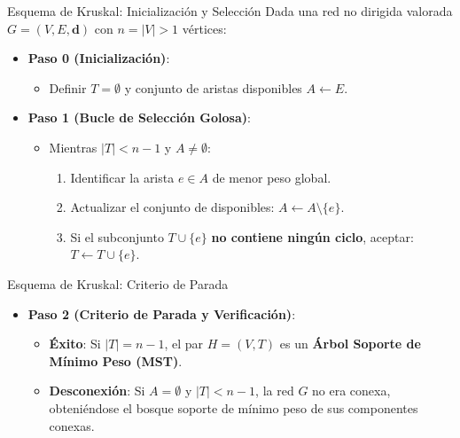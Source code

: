 \documentclass[
  ignorenonframetext,
]{beamer}
\providecommand{\tightlist}{%
  \setlength{\itemsep}{0pt}\setlength{\parskip}{0pt}}
\begin{document}
\begin{frame}{Esquema de Kruskal: Inicialización y Selección}
\label{esquema-de-kruskal-inicializaciuxf3n-y-selecciuxf3n}
Dada una red no dirigida valorada \(G = (V, E, \mathbf{d})\) con
\(n = |V| > 1\) vértices:

\begin{itemize}
\tightlist
\item
  \textbf{Paso 0 (Inicialización)}:

  \begin{itemize}
  \tightlist
  \item
    Definir \(T = \emptyset\) y conjunto de aristas disponibles
    \(A \leftarrow E\).
  \end{itemize}
\item
  \textbf{Paso 1 (Bucle de Selección Golosa)}:

  \begin{itemize}
  \tightlist
  \item
    Mientras \(|T| < n - 1\) y \(A \neq \emptyset\):

    \begin{enumerate}
    \tightlist
    \item
      Identificar la arista \(e \in A\) de menor peso global.
    \item
      Actualizar el conjunto de disponibles:
      \(A \leftarrow A \setminus \{e\}\).
    \item
      Si el subconjunto \(T \cup \{e\}\) \textbf{no contiene ningún
      ciclo}, aceptar: \(T \leftarrow T \cup \{e\}\).
    \end{enumerate}
  \end{itemize}
\end{itemize}
\end{frame}

\begin{frame}{Esquema de Kruskal: Criterio de Parada}
\label{esquema-de-kruskal-criterio-de-parada}
\begin{itemize}
\item
  \textbf{Paso 2 (Criterio de Parada y Verificación)}:

  \begin{itemize}
  \item
    \textbf{Éxito}: Si \(|T| = n - 1\), el par \(H = (V, T)\) es un
    \textbf{Árbol Soporte de Mínimo Peso (MST)}.
  \item
    \textbf{Desconexión}: Si \(A = \emptyset\) y \(|T| < n - 1\), la red
    \(G\) no era conexa, obteniéndose el bosque soporte de mínimo peso
    de sus componentes conexas.
  \end{itemize}
\end{itemize}
\end{frame}
\end{document}
